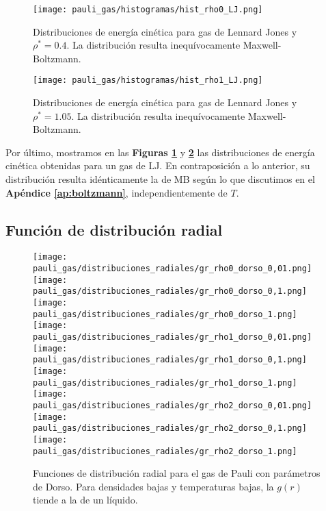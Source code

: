 \begin{figure}[H]
	\centering
	\texttt{[image: pauli\_gas/histogramas/hist\_rho0\_LJ.png]}
	\caption{Distribuciones de energía cinética para gas de Lennard Jones y $\rho^* = 0.4$.
		La distribución resulta inequívocamente Maxwell-Boltzmann.}
	\label{fig:hist_rho0_LJ}
\end{figure}
\begin{figure}[H]
	\centering
	\texttt{[image: pauli\_gas/histogramas/hist\_rho1\_LJ.png]}
	\caption{Distribuciones de energía cinética para gas de Lennard Jones y $\rho^* = 1.05$.
		La distribución resulta inequívocamente Maxwell-Boltzmann.}
	\label{fig:hist_rho1_LJ}
\end{figure}

Por último, mostramos en las \textbf{Figuras \ref{fig:hist_rho0_LJ}} y \textbf{\ref{fig:hist_rho1_LJ}} las distribuciones de energía cinética obtenidas para un gas de LJ.
En contraposición a lo anterior, su distribución resulta idénticamente la de MB según lo que discutimos en el \textbf{Apéndice \ref{ap:boltzmann}}, independientemente de $T$.


\subsection{Función de distribución radial}{\label{sec:gr_pauli_gas}}

\begin{figure}[H]
	\centering	%
	\texttt{[image: pauli\_gas/distribuciones\_radiales/gr\_rho0\_dorso\_0,01.png]}
	\texttt{[image: pauli\_gas/distribuciones\_radiales/gr\_rho0\_dorso\_0,1.png]}
	\texttt{[image: pauli\_gas/distribuciones\_radiales/gr\_rho0\_dorso\_1.png]}
	\texttt{[image: pauli\_gas/distribuciones\_radiales/gr\_rho1\_dorso\_0,01.png]}
	\texttt{[image: pauli\_gas/distribuciones\_radiales/gr\_rho1\_dorso\_0,1.png]}
	\texttt{[image: pauli\_gas/distribuciones\_radiales/gr\_rho1\_dorso\_1.png]}
	\texttt{[image: pauli\_gas/distribuciones\_radiales/gr\_rho2\_dorso\_0,01.png]}
	\texttt{[image: pauli\_gas/distribuciones\_radiales/gr\_rho2\_dorso\_0,1.png]}
	\texttt{[image: pauli\_gas/distribuciones\_radiales/gr\_rho2\_dorso\_1.png]}
	\caption{Funciones de distribución radial para el gas de Pauli con parámetros de Dorso.
		Para densidades bajas y temperaturas bajas, la $g(r)$ tiende a la de un líquido.}
	\label{fig:gr_dorso}
\end{figure}

